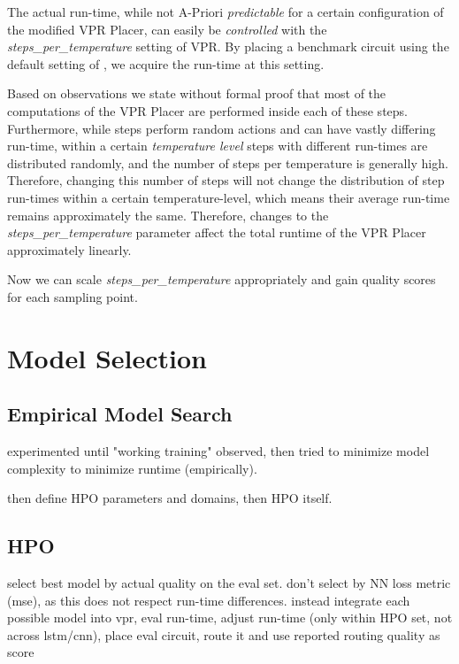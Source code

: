 The actual run-time, while not A-Priori \textit{predictable} for a certain configuration of the modified \gls{VPR} Placer, can easily be \textit{controlled} with the \textit{steps\_per\_temperature}\cite{TODO} setting of \gls{VPR}. By placing a benchmark circuit using the default setting of \cite{TODO}, we acquire the run-time at this setting. 

Based on observations we state without formal proof that most of the computations of the \gls{VPR} Placer are performed inside each of these steps. Furthermore, while steps perform random actions and can have vastly differing run-time, within a certain \textit{temperature level} steps with different run-times are distributed randomly, and the number of steps per temperature is generally high. Therefore, changing this number of steps will not change the distribution of step run-times within a certain temperature-level, which means their average run-time remains approximately the same. Therefore, changes to the \textit{steps\_per\_temperature} parameter affect the total runtime of the \gls{VPR} Placer approximately linearly.

Now we can scale \textit{steps\_per\_temperature} appropriately and gain quality scores for each sampling point.

\section{Model Selection}\label{ch:model-selection}

\subsection{Empirical Model Search}

experimented until "working training" observed, then tried to minimize model complexity to minimize runtime (empirically). 

then define HPO parameters and domains, then HPO itself.

\subsection{\gls{HPO}}

select best model by actual quality on the eval set. don't select by NN loss metric (mse), as this does not respect run-time differences. instead integrate each possible model into vpr, eval run-time, adjust run-time (only within HPO set, not across lstm/cnn), place eval circuit, route it and use reported routing quality as score

